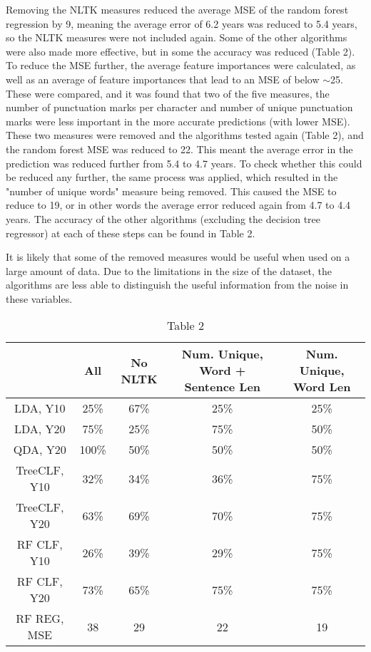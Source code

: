 \documentclass[11pt,a4paper,reqno]{amsart}
\begin{document}
Removing the NLTK measures reduced the average MSE of the random forest regression by 9, meaning the average error of 6.2 years was reduced to 5.4 years, so the NLTK measures were not included again. Some of the other algorithms were also made more effective, but in some the accuracy was reduced (Table 2). To reduce the MSE further, the average feature importances were calculated, as well as an average of feature importances that lead to an MSE of below $\sim$25. These were compared, and it was found that two of the five measures, the number of punctuation marks per character and number of unique punctuation marks were less important in the more accurate predictions (with lower MSE). These two measures were removed and the algorithms tested again (Table 2), and the random forest MSE was reduced to 22. This meant the average error in the prediction was reduced further from 5.4 to 4.7 years. To check whether this could be reduced any further, the same process was applied, which resulted in the "number of unique words" measure being removed. This caused the MSE to reduce to 19, or in other words the average error reduced again from 4.7 to 4.4 years. The accuracy of the other algorithms (excluding the decision tree regressor) at each of these steps can be found in Table 2.

It is likely that some of the removed measures would be useful when used on a large amount of data. Due to the limitations in the size of the dataset, the algorithms are less able to distinguish the useful information from the noise in these variables.

\begin{center}
\begin{table}
\begin{tabular}{ |c|c|c|c|c| } 
 \hline
  & All & No NLTK & Num. Unique, Word + Sentence Len & Num. Unique, Word Len  \\
 \hline
 LDA, Y10 & 25\% & 67\% & 25\% & 25\%   \\
 LDA, Y20 & 75\% & 25\% & 75\% & 50\%   \\
 QDA, Y20 & 100\% & 50\% & 50\% & 50\%   \\
 TreeCLF, Y10 & 32\% & 34\% & 36\% & 75\%   \\
 TreeCLF, Y20 & 63\% & 69\% & 70\% & 75\%   \\
 RF CLF, Y10 & 26\% & 39\% & 29\% & 75\%   \\
 RF CLF, Y20 & 73\% & 65\% & 75\% & 75\%   \\
 RF REG, MSE & 38 & 29 & 22 & 19   \\
 \hline
\end{tabular}
\caption*{Table 2}
\end{table}
\end{center}
\end{document}
